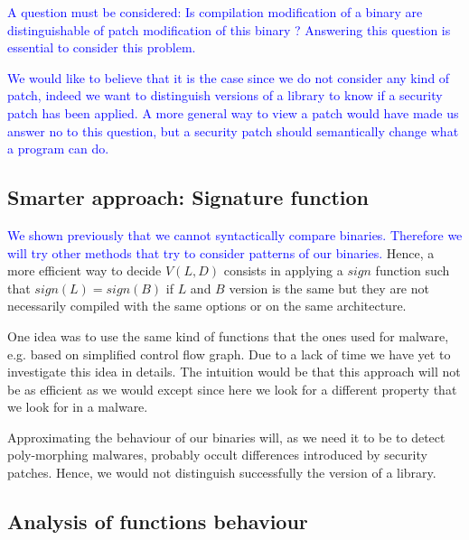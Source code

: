 \documentclass{article}
\newcommand{\ludo}[1]{\textcolor{blue}{#1}}
\newcommand{\signature}{{sign}}
\begin{document}
    \ludo{A question must be considered: Is compilation modification of a
    binary are distinguishable of patch modification of this binary ?
    Answering this question is essential to consider this problem.}

    \ludo{We would like to believe that it is the case since we do not
    consider any kind of patch, indeed we want to distinguish versions of a
    library to know if a security patch has been applied. A more general way
    to view a patch would have made us answer no to this question, but a
    security patch should semantically change what a program can do.}

    \subsection{Smarter approach: Signature function}\label{approach-sign}

    \ludo{We shown previously that we cannot syntactically compare binaries.
    Therefore we will try other methods that try to consider patterns of our
    binaries.} Hence, a more efficient way to decide $V(L,D)$ consists in
    applying a $\signature$ function such that $\signature(L) = \signature(B)$
    if $L$ and $B$ version is the same but they are not necessarily
    compiled with the same options or on the same architecture.
	
    One idea was to use the same kind of functions that the ones used for malware, e.g.
    based on simplified control flow graph. Due to a lack of time we have yet 
    to investigate this idea in details. The intuition would be that this
    approach will not be as efficient as we would except since here we look
    for a different property that we look for in a malware. 
    
    Approximating the behaviour of our binaries will, as we need it to be to
    detect poly-morphing malwares, probably occult differences introduced by
    security patches. Hence, we would not distinguish successfully the version
    of a library.
	
	\subsection{Analysis of functions behaviour}
	
\end{document}

